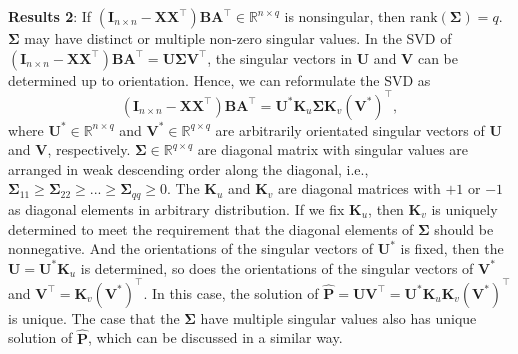 \documentclass[titlepage,11pt,twoside]{article}
\begin{document}
\textbf{Results 2}: If $(\mathbf{I}_{n\times n}-\mathbf{X}\mathbf{X}^{\top})\mathbf{B}\mathbf{A}^{\top}\in\mathbb{R}^{n\times q}$ is nonsingular, then $\text{rank}(\mathbf{\Sigma})=q$. $\mathbf{\Sigma}$ may have distinct or multiple non-zero singular values. In the SVD of $(\mathbf{I}_{n\times n}-\mathbf{X}\mathbf{X}^{\top})\mathbf{B}\mathbf{A}^{\top}
=
\mathbf{U}\mathbf{\Sigma}\mathbf{V}^{\top}$, the singular vectors in $\mathbf{U}$ and $\mathbf{V}$
can be determined up to orientation. Hence, we can reformulate the SVD as 
\begin{equation}
(\mathbf{I}_{n\times n}-\mathbf{X}\mathbf{X}^{\top})\mathbf{B}\mathbf{A}^{\top}
=
\mathbf{U}^{*}\mathbf{K}_{u}\mathbf{\Sigma}\mathbf{K}_{v}(\mathbf{V}^{*})^{\top},
\end{equation}
where $\mathbf{U}^{*}\in \mathbb{R}^{n\times q}$ and $\mathbf{V}^{*}\in \mathbb{R}^{q\times q}$ are arbitrarily orientated singular vectors of $\mathbf{U}$ and $\mathbf{V}$, respectively. $\mathbf{\Sigma}\in \mathbb{R}^{q\times q}$ are diagonal matrix with singular values are arranged in weak descending order along the diagonal, i.e., $\mathbf{\Sigma}_{11}\ge\mathbf{\Sigma}_{22}\ge...\ge\mathbf{\Sigma}_{qq}\ge0$. The $\mathbf{K}_{u}$ and $\mathbf{K}_{v}$ are diagonal matrices with $+1$ or $-1$ as diagonal elements in arbitrary distribution. If we fix $\mathbf{K}_{u}$, then $\mathbf{K}_{v}$ is uniquely determined to meet the requirement that the diagonal elements of $\mathbf{\Sigma}$ should be nonnegative. And the orientations of the singular vectors of $\mathbf{U}^{*}$ is fixed, then the $\mathbf{U}=\mathbf{U}^{*}\mathbf{K}_{u}$ is determined, so does the orientations of the singular vectors of $\mathbf{V}^{*}$ and $\mathbf{V}^{\top}=\mathbf{K}_{v}(\mathbf{V}^{*})^{\top}$. In this case, the solution of $\mathbf{\hat{P}}=\mathbf{U}\mathbf{V}^{\top}=\mathbf{U}^{*}\mathbf{K}_{u}\mathbf{K}_{v}(\mathbf{V}^{*})^{\top}$ is unique. The case that the $\mathbf{\Sigma}$ have multiple singular values also has unique solution of $\mathbf{\hat{P}}$, which can be discussed in a similar way. 
\end{document}
